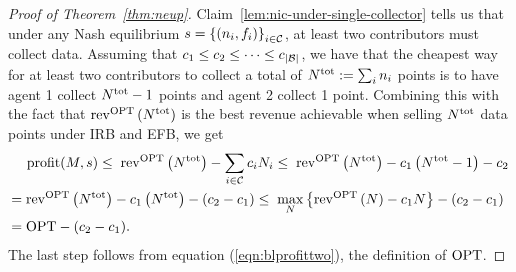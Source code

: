 \begin{proof}[Proof of Theorem~\ref{thm:neup}]
    Claim~\ref{lem:nic-under-single-collector}
    tells us that under any Nash equilibrium $s=\left\{(n_i, f_i)\right\}_{i\in\mathcal{C}}$, at least two contributors must collect data. Assuming that $c_1 \leq c_2 \leq \dots \leq c_{|\mathcal{B}|}$, we have that the cheapest way for at least two contributors to collect a total of $N^{\rm tot}            := \sum_{i} n_i$ points is to have agent 1 collect $N^{\rm tot}-1$ points and agent 2 collect 1 point. Combining this with the fact that 
    $\mathrm{rev}^{\rm OPT}\left( N^{\rm tot}\right)$ is the best revenue achievable when selling $N^{\rm tot}$ data points under IRB and EFB, we get
    \begin{align*}
        &~{\rm profit}(M, s)  \leq \;  
        \mathrm{rev}^{\rm OPT}\left( 
            N^{\rm tot} 
        \right) 
        - \sum_{i\in\mathcal{C}} c_i N_i \leq \;  
        \mathrm{rev}^{\rm OPT}\left( 
            N^{\rm tot} 
        \right) 
        -  c_1 \left(N^{\rm tot} -1\right) -  c_2 
        \\ 
        = &  \; \mathrm{rev}^{\rm OPT}
        \left( 
            N^{\rm tot} 
        \right) 
        -  c_1 \left(N^{\rm tot}\right) -  (c_2 -c_1)   \leq  \; \max_N \left\{ \mathrm{rev}^{\rm OPT}\left(N\right) - c_1 N\right\} -  (c_2 -c_1) 
        \\ 
        = &  \; {\rm OPT} - (c_2 - c_1) .
    \end{align*}
    The last step follows from equation (\ref{eqn:blprofittwo}), the definition of ${\rm OPT}$. 
\end{proof}




